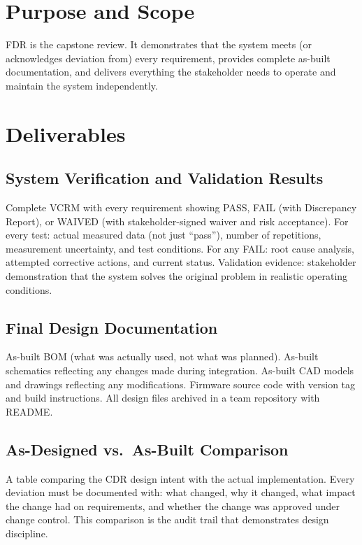 \documentclass[11pt,letterpaper,twoside,openany]{book}
\begin{document}
\vspace{1em}

\section{Purpose and Scope}
FDR is the capstone review. It demonstrates that the system meets (or acknowledges deviation from) every requirement, provides complete as-built documentation, and delivers everything the stakeholder needs to operate and maintain the system independently.

\section{Deliverables}

\subsection{System Verification and Validation Results}
Complete VCRM with every requirement showing PASS, FAIL (with Discrepancy Report), or WAIVED (with stakeholder-signed waiver and risk acceptance). For every test: actual measured data (not just ``pass''), number of repetitions, measurement uncertainty, and test conditions. For any FAIL: root cause analysis, attempted corrective actions, and current status. Validation evidence: stakeholder demonstration that the system solves the original problem in realistic operating conditions.

\subsection{Final Design Documentation}
As-built BOM (what was actually used, not what was planned). As-built schematics reflecting any changes made during integration. As-built CAD models and drawings reflecting any modifications. Firmware source code with version tag and build instructions. All design files archived in a team repository with README.

\subsection{As-Designed vs.\ As-Built Comparison}
A table comparing the CDR design intent with the actual implementation. Every deviation must be documented with: what changed, why it changed, what impact the change had on requirements, and whether the change was approved under change control. This comparison is the audit trail that demonstrates design discipline.
\end{document}
